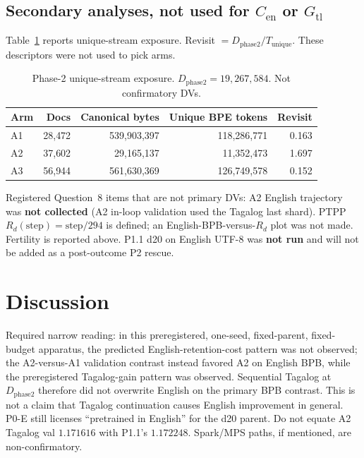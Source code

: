 \documentclass[11pt,a4paper]{article}
\begin{document}
\subsection{Secondary analyses, not used for $C_{\mathrm{en}}$ or $G_{\mathrm{tl}}$}
Table~\ref{tab:exposure} reports unique-stream exposure. Revisit $=D_{\mathrm{phase2}}/T_{\mathrm{unique}}$. These descriptors were not used to pick arms.

\begin{table}[t]
\centering
\caption{Phase-2 unique-stream exposure. $D_{\mathrm{phase2}}=19{,}267{,}584$. Not confirmatory DVs.}
\label{tab:exposure}
\begin{tabular}{lrrrr}
\toprule
Arm & Docs & Canonical bytes & Unique BPE tokens & Revisit \\
\midrule
A1 & 28{,}472 & 539{,}903{,}397 & 118{,}286{,}771 & 0.163 \\
A2 & 37{,}602 & 29{,}165{,}137 & 11{,}352{,}473 & 1.697 \\
A3 & 56{,}944 & 561{,}630{,}369 & 126{,}749{,}578 & 0.152 \\
\bottomrule
\end{tabular}
\end{table}

Registered Question~8 items that are not primary DVs: A2 English trajectory was \textbf{not collected} (A2 in-loop validation used the Tagalog last shard). PTPP $R_d(\mathrm{step})=\mathrm{step}/294$ is defined; an English-BPB-versus-$R_d$ plot was not made. Fertility is reported above. P1.1 d20 on English UTF-8 was \textbf{not run} and will not be added as a post-outcome P2 rescue.

\section{Discussion}
\label{sec:discussion}

Required narrow reading: in this preregistered, one-seed, fixed-parent, fixed-budget apparatus, the predicted English-retention-cost pattern was not observed; the A2-versus-A1 validation contrast instead favored A2 on English BPB, while the preregistered Tagalog-gain pattern was observed. Sequential Tagalog at $D_{\mathrm{phase2}}$ therefore did not overwrite English on the primary BPB contrast. This is not a claim that Tagalog continuation causes English improvement in general. P0-E still licenses ``pretrained in English'' for the d20 parent. Do not equate A2 Tagalog val $1.171616$ with P1.1's $1.172248$. Spark/MPS paths, if mentioned, are non-confirmatory.
\end{document}
